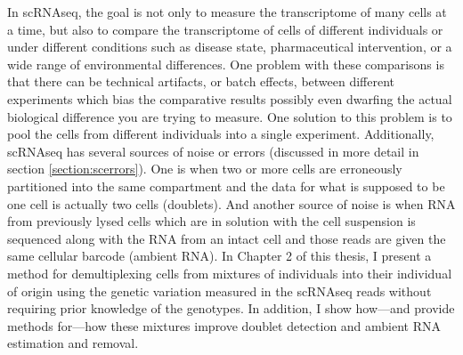 \par{
In scRNAseq, the goal is not only to measure the transcriptome of many cells at a time, but also to compare the transcriptome of cells of different individuals or under different conditions such as disease state, pharmaceutical intervention, or a wide range of environmental differences. One problem with these comparisons is that there can be technical artifacts, or batch effects, between different experiments which bias the comparative results possibly even dwarfing the actual biological difference you are trying to measure. One solution to this problem is to pool the cells from different individuals into a single experiment. Additionally, scRNAseq has several sources of noise or errors (discussed in more detail in section \ref{section:scerrors}). One is when two or more cells are erroneously partitioned into the same compartment and the data for what is supposed to be one cell is actually two cells (doublets). And another source of noise is when RNA from previously lysed cells which are in solution with the cell suspension is sequenced along with the RNA from an intact cell and those reads are given the same cellular barcode (ambient RNA). In Chapter 2 of this thesis, I present a method for demultiplexing cells from mixtures of individuals into their individual of origin using the genetic variation measured in the scRNAseq reads without requiring prior knowledge of the genotypes. In addition, I show how---and provide methods for---how these mixtures improve doublet detection and ambient RNA estimation and removal.
} 

